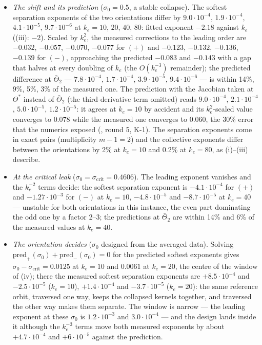 \begin{itemize}
  \item \emph{The shift and its prediction} ($\sigma_0 = 0.5$, a stable collapse). The softest separation exponents
    of the two orientations differ by $9.0\cdot10^{-4}$, $1.9\cdot10^{-4}$, $4.1\cdot10^{-5}$, $9.7\cdot10^{-6}$ at
    $k_e = 10$, $20$, $40$, $80$: fitted exponent $-2.18$ against $k_e$ ((iii): $-2$). Scaled by $k_e^2$, the
    measured corrections to the leading order are $-0.032$, $-0.057$, $-0.070$, $-0.077$ for $(+)$ and $-0.123$,
    $-0.132$, $-0.136$, $-0.139$ for $(-)$, approaching the predicted $-0.083$ and $-0.143$ with a gap that halves at
    every doubling of $k_e$ (the $O(k_e^{-3})$ remainder); the predicted difference at $\bar\Theta_2$ ---
    $7.8\cdot10^{-4}$, $1.7\cdot10^{-4}$, $3.9\cdot10^{-5}$, $9.4\cdot10^{-6}$ --- is within 14\%, 9\%, 5\%, 3\% of
    the measured one. The prediction with the Jacobian taken at $\Theta^*$ instead of $\bar\Theta_2$ (the
    third-derivative term omitted) reads $9.0\cdot10^{-4}$, $2.1\cdot10^{-4}$, $5.0\cdot10^{-5}$, $1.2\cdot10^{-5}$:
    it agrees at $k_e = 10$ by accident and its $k_e^2$-scaled value converges to $0.078$ while the measured one
    converges to $0.060$, the 30\% error that the numerics exposed (, round 5, K-1). The
    separation exponents come in exact pairs (multiplicity $m - 1 = 2$) and the collective exponents differ between
    the orientations by 2\% at $k_e = 10$ and 0.2\% at $k_e = 80$, as (i)--(iii) describe.
  \item \emph{At the critical leak} ($\sigma_0 = \sigma_{\mathrm{crit}} = 0.4606$). The leading exponent vanishes and
    the $k_e^{-2}$ terms decide: the softest separation exponent is $-4.1\cdot10^{-4}$ for $(+)$ and
    $-1.27\cdot10^{-3}$ for $(-)$ at $k_e = 10$, $-4.8\cdot10^{-5}$ and $-8.7\cdot10^{-5}$ at $k_e = 40$ --- unstable
    for both orientations in this instance, the even part dominating the odd one by a factor 2--3; the predictions at
    $\bar\Theta_2$ are within 14\% and 6\% of the measured values at $k_e = 40$.
  \item \emph{The orientation decides} ($\sigma_0$ designed from the averaged data). Solving
    $\mathrm{pred}_+(\sigma_0) + \mathrm{pred}_-(\sigma_0) = 0$ for the predicted softest exponents gives
    $\sigma_0 - \sigma_{\mathrm{crit}} = 0.0125$ at $k_e = 10$ and $0.0061$ at $k_e = 20$, the centre of the window of
    (iv); there the measured softest separation exponents are $+8.5\cdot10^{-4}$ and $-2.5\cdot10^{-5}$ ($k_e = 10$),
    $+1.4\cdot10^{-4}$ and $-3.7\cdot10^{-5}$ ($k_e = 20$): the same reference orbit, traversed one way, keeps the
    collapsed kernels together, and traversed the other way makes them separate. The window is narrow --- the leading
    exponent at these $\sigma_0$ is $1.2\cdot10^{-3}$ and $3.0\cdot10^{-4}$ --- and the design lands inside it
    although the $k_e^{-3}$ terms move both measured exponents by about $+4.7\cdot10^{-4}$ and $+6\cdot10^{-5}$
    against the prediction.
\end{itemize}

